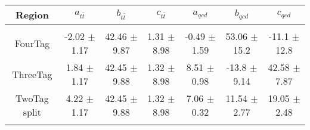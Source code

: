 \begin{footnotesize} 
\begin{tabular}{c|c|c|c|c|c|c} 
Region & $ a_{t\bar{t}}$ & $ b_{t\bar{t}}$ & $ c_{t\bar{t}}$ & $ a_{qcd}$ & $ b_{qcd}$ & $c_{qcd}$ \\ 
\hline\hline 
& & & & & &\\ 
FourTag & -2.02 $\pm$ 1.17 & 42.46 $\pm$ 9.87 & 1.31 $\pm$ 8.98 & -0.49 $\pm$ 1.59 & 53.06 $\pm$ 15.2 & -11.1 $\pm$ 12.8\\ 
ThreeTag & 1.84 $\pm$ 1.17 & 42.45 $\pm$ 9.88 & 1.32 $\pm$ 8.98 & 8.51 $\pm$ 0.98 & -13.8 $\pm$ 9.14 & 42.58 $\pm$ 7.87\\ 
TwoTag split & 4.22 $\pm$ 1.17 & 42.45 $\pm$ 9.88 & 1.32 $\pm$ 8.98 & 7.06 $\pm$ 0.32 & 11.54 $\pm$ 2.77 & 19.05 $\pm$ 2.48\\ 
& & & & & &\\ 
\hline\hline 
\end{tabular} 
\end{footnotesize} 
\newline 
